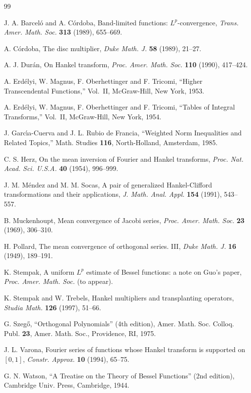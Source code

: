 \documentclass[reqno]{amsart}
\theoremstyle{plain}
\theoremstyle{definition}
\theoremstyle{remark}
\begin{document}
\begin{thebibliography}{99}

 J. A. Barcel\'o and A. C\'ordoba,
{Band-limited functions: $L^p$-convergence},
\textit{Trans. Amer. Math. Soc.}
\textbf{313} (1989), 655--669.

 A. C\'ordoba,
{The disc multiplier},
\textit{Duke Math. J.}
\textbf{58} (1989), 21--27.

 A. J. Dur\'an,
{On Hankel transform},
\textit{Proc. Amer. Math. Soc.}
\textbf{110} (1990), 417--424.

 A. Erd\'elyi, W. Magnus, F. Oberhettinger and F. Tricomi,
{``Higher Transcendental Functions,''} Vol.~II,
McGraw-Hill, New York, 1953.

 A. Erd\'elyi, W. Magnus, F. Oberhettinger and F. Tricomi,
{``Tables of Integral Transforms,''} Vol.~II,
McGraw-Hill, New York, 1954.

 J. Garc\'{\i}a-Cuerva and J. L. Rubio de Francia,
{``Weighted Norm Inequalities and Related Topics,''}
Math. Studies \textbf{116},
North-Holland, Amsterdam, 1985.

 C. S. Herz,
{On the mean inversion of Fourier and Hankel transforms},
\textit{Proc. Nat. Acad. Sci. U.S.A.}
\textbf{40} (1954), 996--999.

 J. M. M\'endez and M. M. Socas,
{A pair of generalized Hankel-Clifford transformations and their applications},
\textit{J. Math. Anal. Appl.}
\textbf{154} (1991), 543--557.

 B. Muckenhoupt,
{Mean convergence of Jacobi series},
\textit{Proc. Amer. Math. Soc.}
\textbf{23} (1969), 306--310.

 H. Pollard,
{The mean convergence of orthogonal series. III},
\textit{Duke Math. J.}
\textbf{16} (1949), 189--191.

 K. Stempak,
{A uniform $L^p$ estimate of Bessel functions: a note on Guo's paper},
\textit{Proc. Amer. Math. Soc.} (to appear).

 K. Stempak and W. Trebels,
{Hankel multipliers and transplanting operators},
\textit{Studia Math.}
\textbf{126} (1997), 51--66.

 G. Szeg\H{o},
{``Orthogonal Polynomials''} (4th edition),
Amer. Math. Soc. Colloq. Publ. \textbf{23},
Amer. Math. Soc.,
Providence, RI, 1975.

 J. L. Varona,
{Fourier series of functions whose Hankel transform is supported on $[0,1]$},
\textit{Constr. Approx.}
\textbf{10} (1994), 65--75.

 G. N. Watson,
{``A Treatise on the Theory of Bessel Functions''} (2nd edition),
Cambridge Univ. Press,
Cambridge, 1944.

\end{thebibliography}
\end{document}
